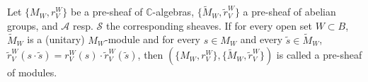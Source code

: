 Let $\{M_W, r_V^W\}$ be a pre-sheaf of $\mathbb{C}$-algebras, $\{\tilde{M}_W, \tilde{r}_V^W\}$ a pre-sheaf of abelian groups, and $\mathcal{A}$ resp. $\mathcal{S}$ the corresponding sheaves. If for every open set $W \subset B$, $\tilde{M}_W$ is a (unitary) $M_W$-module and for every $s \in M_W$ and every $\tilde{s} \in \tilde{M}_W$, $\tilde{r}_V^W(s \cdot \tilde{s}) = r_V^W(s) \cdot \tilde{r}_V^W(\tilde{s})$, then $(\{M_W, r_V^W\}, \{\tilde{M}_W, \tilde{r}_V^W\})$ is called a pre-sheaf of modules.
